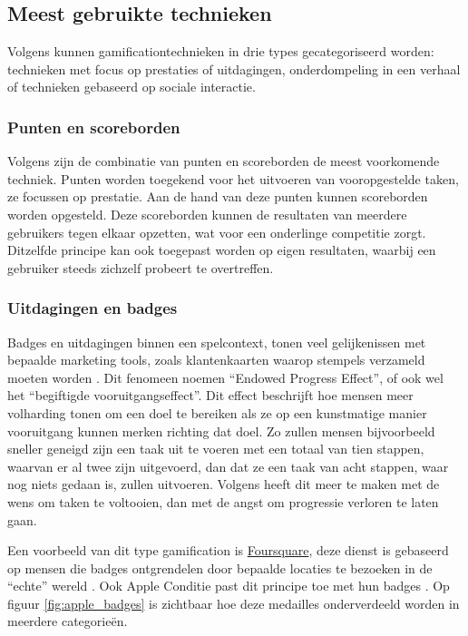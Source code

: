 \subsection{Meest gebruikte technieken}
Volgens \textcite{Legaki2020} kunnen gamificationtechnieken in drie types gecategoriseerd worden: technieken met focus op prestaties of uitdagingen, onderdompeling in een verhaal of technieken gebaseerd op sociale interactie.

\subsubsection{Punten en scoreborden}
\label{sssec:labels_scoreborden}
Volgens \textcite{Hamari2014} zijn de combinatie van punten en scoreborden de meest voorkomende techniek. Punten worden toegekend voor het uitvoeren van vooropgestelde taken, ze focussen op prestatie. Aan de hand van deze punten kunnen scoreborden worden opgesteld. Deze scoreborden kunnen de resultaten van meerdere gebruikers tegen elkaar opzetten, wat voor een onderlinge competitie zorgt. Ditzelfde principe kan ook toegepast worden op eigen resultaten, waarbij een gebruiker steeds zichzelf probeert te overtreffen.

\subsubsection{Uitdagingen en badges}
Badges en uitdagingen binnen een spelcontext, tonen veel gelijkenissen met bepaalde marketing tools, zoals klantenkaarten waarop stempels verzameld moeten worden \autocite{Nunes2006}. Dit fenomeen noemen \textcite{Nunes2006} ``Endowed Progress Effect'', of ook wel het ``begiftigde vooruitgangseffect''. Dit effect beschrijft hoe mensen meer volharding tonen om een doel te bereiken als ze op een kunstmatige manier vooruitgang kunnen merken richting dat doel. Zo zullen mensen bijvoorbeeld sneller geneigd zijn een taak uit te voeren met een totaal van tien stappen, waarvan er al twee zijn uitgevoerd, dan dat ze een taak van acht stappen, waar nog niets gedaan is, zullen uitvoeren. Volgens \textcite{Nunes2006} heeft dit meer te maken met de wens om taken te voltooien, dan met de angst om progressie verloren te laten gaan.

Een voorbeeld van dit type gamification is \href{https://foursquare.com/}{Foursquare}, deze dienst is gebaseerd op mensen die badges ontgrendelen door bepaalde locaties te bezoeken in de ``echte'' wereld \autocite{Hamari2011}. Ook Apple Conditie past dit principe toe met hun badges \autocite{Ha2020}. Op figuur \ref{fig:apple_badges} is zichtbaar hoe deze medailles onderverdeeld worden in meerdere categorieën.


